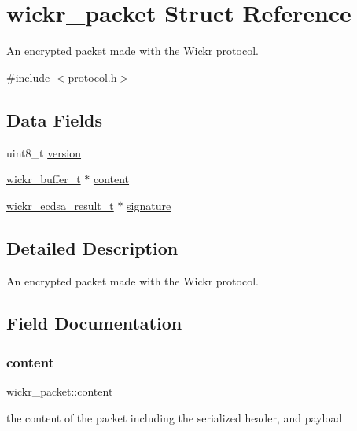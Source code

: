\hypertarget{structwickr__packet}{}\section{wickr\+\_\+packet Struct Reference}
\label{structwickr__packet}


An encrypted packet made with the Wickr protocol.  




{\ttfamily \#include $<$protocol.\+h$>$}

\subsection*{Data Fields}
\begin{DoxyCompactItemize}
\item 
uint8\+\_\+t \mbox{\hyperlink{structwickr__packet_a35c17c926c267a603e810b88961c2bf3}{version}}
\item 
\mbox{\hyperlink{structwickr__buffer}{wickr\+\_\+buffer\+\_\+t}} $\ast$ \mbox{\hyperlink{structwickr__packet_a4d17d017c9d0fbb6e748a7ed935e5512}{content}}
\item 
\mbox{\hyperlink{structwickr__ecdsa__result}{wickr\+\_\+ecdsa\+\_\+result\+\_\+t}} $\ast$ \mbox{\hyperlink{structwickr__packet_a8b5e9a4eed6f133ffedd1aa9178b5567}{signature}}
\end{DoxyCompactItemize}


\subsection{Detailed Description}
An encrypted packet made with the Wickr protocol. 

\subsection{Field Documentation}
\mbox{\label{structwickr__packet_a4d17d017c9d0fbb6e748a7ed935e5512}} 
\subsubsection{\texorpdfstring{content}{content}}
{\footnotesize\ttfamily wickr\+\_\+packet\+::content}

the content of the packet including the serialized header, and payload \mbox{\label{structwickr__packet_a8b5e9a4eed6f133ffedd1aa9178b5567}} 
